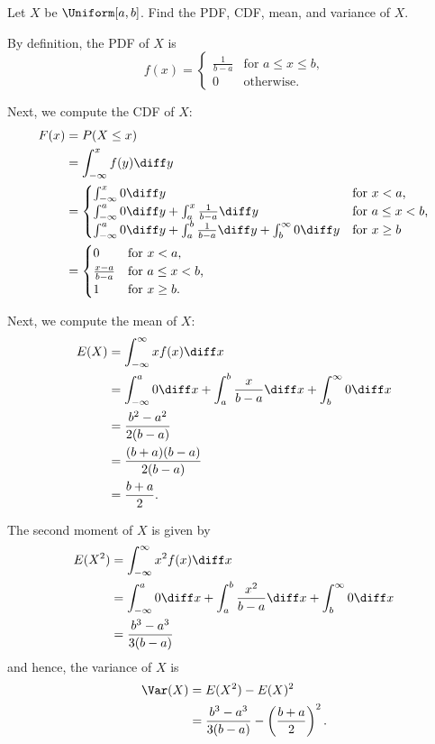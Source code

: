 \begin{problem}[Handout 12, \# 2]
  Let \(X\) be \(\Uniform[a,b]\). Find the PDF, CDF, mean, and variance of
  \(X\).
\end{problem}
\begin{solution}
  By definition, the PDF of \(X\) is
  \[
    f(x)=
    \begin{cases}
      \frac{1}{b-a}&\text{for \(a\leq x\leq b\),}\\
      0&\text{otherwise.}
    \end{cases}
  \]

  Next, we compute the CDF of \(X\):
  \begin{align*}
    F(x)&=P(X\leq x)\\
        &=\int_{-\infty}^x f(y)\diff y\\
        &=\begin{cases}
          \int_{-\infty}^x 0\diff y&\text{for \(x<a\),}\\
          \int_{-\infty}^a 0\diff y%
          +\int_a^x\frac{1}{b-a}\diff y&\text{for \(a\leq x<b\),}\\
          \int_{-\infty}^a 0\diff y%
          +\int_a^b\frac{1}{b-a}\diff y%
          +\int_b^\infty 0\diff y&\text{for \(x\geq b\)}
          \end{cases}\\
        &=\begin{cases}
          0&\text{for \(x<a\),}\\
          \frac{x-a}{b-a}&\text{for \(a\leq x<b\),}\\
          1&\text{for \(x\geq b\).}
        \end{cases}
  \end{align*}

  Next, we compute the mean of \(X\):
  \begin{align*}
    E(X)
    &=\int_{-\infty}^\infty xf(x)\diff x\\
    &=\int_{-\infty}^a 0\diff x%
      +\int_a^b\frac{x}{b-a}\diff x%
      +\int_b^\infty 0\diff x\\
    &=\frac{b^2-a^2}{2(b-a)}\\
    &=\frac{(b+a)(b-a)}{2(b-a)}\\
    &=\frac{b+a}{2}.
  \end{align*}

  The second moment of $X$ is given by
  \begin{align*}
    E(X^2)
    &=\int_{-\infty}^\infty x^2f(x)\diff x\\
    &=\int_{-\infty}^a 0\diff x%
      +\int_a^b \frac{x^2}{b-a}\diff x%
      +\int_b^\infty 0\diff x\\
    &=\frac{b^3-a^3}{3(b-a)}
  \end{align*}
  and hence, the variance of \(X\) is
  \begin{align*}
    \Var(X)
    &=E(X^2)-E(X)^2\\
    &=\frac{b^3-a^3}{3(b-a)}-\left(\frac{b+a}{2}\right)^2.
  \end{align*}
\end{solution}
\newpage

